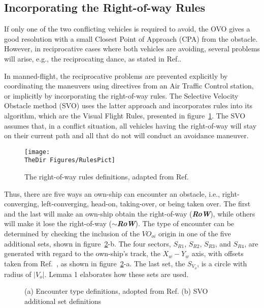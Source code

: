 \subsection{Incorporating the Right-of-way Rules}
If only one of the two conflicting vehicles is required to avoid, the OVO gives a good resolution with a small Closest Point of Approach (CPA) from the obstacle. However, in reciprocative cases where both vehicles are avoiding, several problems will arise, e.g., the reciprocating dance, as stated in Ref.\cite{Snape:11}.

In manned-flight, the reciprocative problems are prevented explicitly by coordinating the maneuvers using directives from an Air Traffic Control station, or implicitly by incorporating the right-of-way rules. The Selective Velocity Obstacle method (SVO) uses the latter approach and incorporates rules into its algorithm, which are the Visual Flight Rules\cite{FAR:91}, presented in figure~\ref{f:RulesPict}. The SVO assumes that, in a conflict situation, all vehicles having the right-of-way will stay on their current path and all that do not will conduct an avoidance maneuver.

\begin{figure}
\centering
\texttt{[image: \\TheDir Figures/RulesPict]}
 \caption{The right-of-way rules definitions, adapted from Ref.\cite{FAR:91}}
 \label{f:RulesPict}
\end{figure}

Thus, there are five ways an own-ship can encounter an obstacle, i.e., right-converging, left-converging, head-on, taking-over, or being taken over. The first and the last will make an own-ship obtain the right-of-way (\textbf{\textit{RoW}}), while others will make it lose the right-of-way (\textbf{\textit{$\sim$RoW}}). The type of encounter can be determined by checking the inclusion of the $VO_{oi}$ origin in one of the five additional sets, shown in figure~\ref{f:SVOconcept}-b. The four sectors, $S_{R1}$, $S_{R2}$, $S_{R3}$, and $S_{R4}$, are generated with regard to the own-ship's track, the $X_w- Y_w $ axis, with offsets taken from Ref.~\cite{FARJO:7110}, as shown in figure~\ref{f:SVOconcept}-a. The last set, the $S_{V_o}$, is a circle with radius of $|V_o|$. Lemma 1 elaborates how these sets are used.

\begin{figure}
\begin{subfigmatrix}{1}
\end{subfigmatrix}
 \caption{(a) Encounter type definitions, adopted from Ref.\cite{FARJO:7110} (b) SVO additional set definitions}
 \label{f:SVOconcept}
\end{figure}

